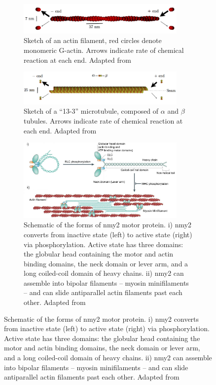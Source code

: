 \begin{figure}[p]

\centering
\begin{subfigure}{\textwidth}
    \centering
    \includegraphics[width=0.9\textwidth]{Introduction/FigureCytoskeleton/actin.pdf}
    \caption{Sketch of an actin filament, red circles denote monomeric G-actin. Arrows indicate rate of chemical reaction at each end. Adapted from \cite{sebastian2012activeChiral}}
    \label{subfig:cytoskeletonMainConsituents-actin}
\end{subfigure}
\hfill
\begin{subfigure}{\textwidth}
    \centering
    \includegraphics[width=0.9\textwidth]{Introduction/FigureCytoskeleton/microtubules.pdf}
    \caption{Sketch of a \enquote{13-3} microtubule, composed of $\alpha$ and $\beta$ tubules. Arrows indicate rate of chemical reaction at each end. Adapted from \cite{sebastian2012activeChiral}}
    \label{subfig:cytoskeletonMainConsituents-microtubule}
\end{subfigure}
\hfill
\begin{subfigure}{\textwidth}
    \centering
    \includegraphics[width=0.9\textwidth]{Introduction/FigureCytoskeleton/myosin.pdf}
    \caption{Schematic of the forms of \acs{nmy2} motor protein. i) \acs{nmy2} converts from inactive state (left) to active state (right) via phosphorylation. Active state has three domains: the globular head containing the motor and actin binding domains, the neck domain or lever arm, and a long coiled-coil domain of heavy chains. ii) \acs{nmy2} can assemble into bipolar filaments -- myosin minifilaments -- and can slide antiparallel actin filaments past each other. Adapted from \cite{vicente2009non}}

\end{subfigure}
\end{figure}
